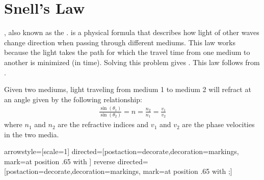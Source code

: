 \section{Snell's Law}

, also known as the . is a physical formula that describes how light of other waves change direction when passing through different mediums. This law works because the light takes the path for which the travel time from one medium to another is minimized (in time). Solving this problem gives . This law follows from .

\begin{fancybox}{1}
    Given two mediums, light traveling from medium 1 to medium 2 will refract at an angle given by the following relationship:
    \begin{align}
        \frac{\sin(\theta_1)}{\sin(\theta_2)} = n = \frac{n_2}{n_1} = \frac{v_1}{v_2} \label{Snell's Law Eqn}
    \end{align}
    where $n_1$ and $n_2$ are the refractive indices and $v_1$ and $v_2$ are the phase velocities in the two media.
\end{fancybox}

\usetikzlibrary{decorations.markings}
\tikzstyle arrowstyle=[scale=1]
\tikzstyle directed=[postaction={decorate,decoration={markings,
    mark=at position .65 with {}}}]
\tikzstyle reverse directed=[postaction={decorate,decoration={markings,
    mark=at position .65 with {;}}}]
